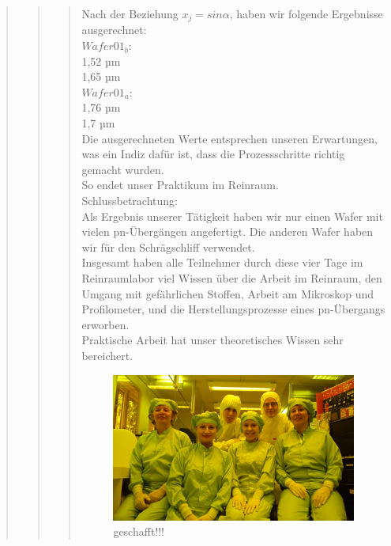 \begin{quote}
\begin{quote}
\begin{quote}
			Nach  der Beziehung $x_j=sin \alpha$, haben wir folgende Ergebnisse 
			ausgerechnet:\\

			$Wafer01_b:$\\
			1,52 µm \\
			1,65 µm \\

			$Wafer01_a:$\\

			1,76 µm\\ 
			1,7 µm\\

 
			Die ausgerechneten Werte entsprechen unseren Erwartungen, was ein 
			Indiz dafür ist, dass die Prozessschritte richtig gemacht wurden.\\ 

			So endet unser Praktikum im Reinraum. \\


			Schlussbetrachtung:\\

			Als Ergebnis unserer Tätigkeit haben wir nur einen Wafer mit vielen 
			pn-Übergängen angefertigt. Die anderen Wafer haben wir für den 
			Schrägschliff verwendet.\\

			Insgesamt haben alle Teilnehmer durch diese vier Tage im 
			Reinraumlabor viel Wissen über die Arbeit im Reinraum, den Umgang 
			mit gefährlichen Stoffen, Arbeit am Mikroskop und Profilometer, und 
			die Herstellungsprozesse eines pn-Übergangs erworben.\\
			Praktische Arbeit hat unser theoretisches Wissen sehr bereichert.
    		
    		\vspace{2em}
    		
    		\begin{figure}[H]
				\hspace{0 cm}
                  \includegraphics[scale=1, trim = 0cm 0cm 0cm 0cm,clip]
                	{./HerstellungBilder/Endbild.png}
                  \caption{geschafft!!!}
                \label{fig:geschafft}
            \end{figure}
            

\end{quote}
\end{quote}
\end{quote}
